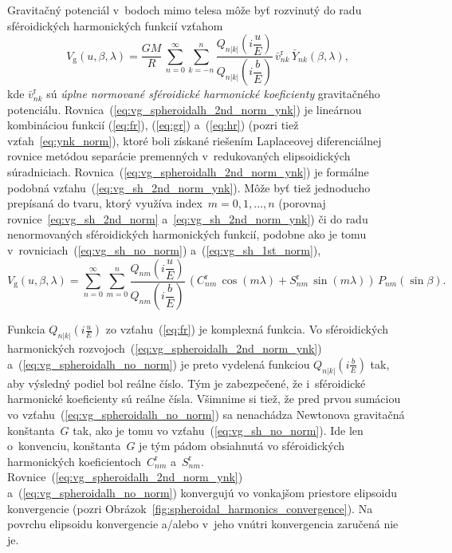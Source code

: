 \documentclass[a4paper, 12pt]{book}
\newcommand{\gidx}{\mathrm g}
\begin{document}
Gravitačný potenciál v~bodoch mimo telesa môže byť rozvinutý do radu 
sféroidických harmonických funkcií vzťahom \parencite{MoritzPhysicalGeodesy}
%
\begin{equation}
\label{eq:vg_spheroidalh_2nd_norm_ynk}
V_\gidx(u, \beta, \lambda) = \frac{GM}{R} \, \sum_{n = 0}^\infty \sum_{k 
= -n}^n \frac{Q_{n|k|}\left( i \dfrac{u}{E} \right)}{Q_{n|k|}\left( 
i \dfrac{b}{E} \right)} \, \bar{v}^{\mathrm{r}}_{nk} \, \bar{Y}_{nk}(\beta, 
\lambda){,}
\end{equation}
%
kde $\bar{v}_{nk}^\mathrm{r}$ sú \emph{úplne normované sféroidické harmonické 
koeficienty} gravitačného potenciálu.  
Rovnica~(\ref{eq:vg_spheroidalh_2nd_norm_ynk}) je lineárnou kombináciou funkcií 
(\ref{eq:fr}), (\ref{eq:gr}) a~(\ref{eq:hr}) (pozri tiež 
vzťah~\ref{eq:ynk_norm}), ktoré boli získané riešením Laplaceovej 
diferenciálnej rovnice metódou separácie premenných v~redukovaných 
elipsoidických súradniciach.  Rovnica~(\ref{eq:vg_spheroidalh_2nd_norm_ynk}) je 
formálne podobná vzťahu~(\ref{eq:vg_sh_2nd_norm_ynk}).  Môže byť tiež 
jednoducho prepísaná do tvaru, ktorý využíva index~$m = 0, 1, \dots, n$ 
(porovnaj rovnice~\ref{eq:vg_sh_2nd_norm} a~\ref{eq:vg_sh_2nd_norm_ynk}) či do 
radu nenormovaných sféroidických harmonických funkcií, podobne ako je tomu 
v~rovniciach~(\ref{eq:vg_sh_no_norm}) a~(\ref{eq:vg_sh_1st_norm}),
%
\begin{equation}
\label{eq:vg_spheroidalh_no_norm}
V_\gidx(u, \beta, \lambda) = \sum_{n = 0}^\infty \sum_{m = 0}^n 
\frac{Q_{nm}\left( i \dfrac{u}{E} \right)}{Q_{nm}\left( i \dfrac{b}{E} \right)} 
\, \left( C^{\mathrm{r}}_{nm} \, \cos(m\lambda) + S^{\mathrm{r}}_{nm} \, 
\sin(m\lambda) \right) \, P_{nm}(\sin\beta){.}
\end{equation}

Funkcia $Q_{n|k|}\left( i \frac{u}{E} \right)$ zo vzťahu~(\ref{eq:fr}) je 
komplexná funkcia.  Vo sféroidických harmonických 
rozvojoch~(\ref{eq:vg_spheroidalh_2nd_norm_ynk}) 
a~(\ref{eq:vg_spheroidalh_no_norm}) je preto vydelená funkciou $Q_{n|k|}\left( 
i \frac{b}{E} \right)$ tak, aby výsledný podiel bol reálne číslo.  Tým je 
zabezpečené, že i~sféroidické harmonické koeficienty sú reálne čísla.  Všimnime 
si tiež, že pred prvou sumáciou vo vzťahu~(\ref{eq:vg_spheroidalh_no_norm}) sa 
nenachádza Newtonova gravitačná konštanta~$G$ tak, ako je tomu vo 
vzťahu~(\ref{eq:vg_sh_no_norm}).  Ide len o~konvenciu, konštanta~$G$ je tým 
pádom obsiahnutá vo sféroidických harmonických 
koeficientoch~$C_{nm}^\mathrm{r}$ a~$S_{nm}^\mathrm{r}$.  
Rovnice~(\ref{eq:vg_spheroidalh_2nd_norm_ynk}) 
a~(\ref{eq:vg_spheroidalh_no_norm}) konvergujú vo vonkajšom priestore elipsoidu 
konvergencie (pozri Obrázok~\ref{fig:spheroidal_harmonics_convergence}).  Na 
povrchu elipsoidu konvergencie a/alebo v~jeho vnútri konvergencia zaručená nie 
je.
\end{document}
